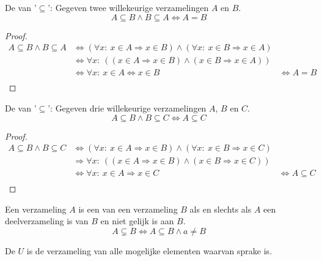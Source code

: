 \documentclass[main.tex]{subfiles}
\begin{document}
\begin{st}
  De  van '$\subseteq$': Gegeven twee willekeurige verzamelingen $A$ en $B$.
  \[ A \subseteq B \wedge B \subseteq A  \Leftrightarrow A = B \]
  \begin{proof}
    \[
    \begin{array}{cll}
      A \subseteq B \wedge B \subseteq A &\Leftrightarrow (\forall x:\ x \in A \Rightarrow x \in B) \wedge (\forall x:\ x \in B \Rightarrow x \in A) &\\
      & \Leftrightarrow \forall x:\ ((x \in A \Rightarrow x \in B) \wedge (x \in B \Rightarrow x \in A)) &\\
      & \Leftrightarrow \forall x:\ x \in A \Leftrightarrow x \in B &\Leftrightarrow A = B  \\
    \end{array}
    \]
  \end{proof}
\end{st}

\begin{st}
  De  van '$\subseteq$': Gegeven drie willekeurige verzamelingen $A$, $B$ en $C$.
  \[ A \subseteq B \wedge B \subseteq C  \Leftrightarrow A \subseteq C \]
  \begin{proof}
    \[
    \begin{array}{cll}
      A \subseteq B \wedge B \subseteq C &\Leftrightarrow (\forall x:\ x \in A \Rightarrow x \in B) \wedge (\forall x:\ x \in B \Rightarrow x \in C) &\\
      & \Rightarrow \forall x:\ ((x \in A \Rightarrow x \in B) \wedge (x \in B \Rightarrow x \in C)) &\\
      & \Leftrightarrow \forall x:\ x \in A \Rightarrow x \in C &\Leftrightarrow A \subseteq C  \\
    \end{array}
    \]
  \end{proof}
\end{st}

\begin{de}
  Een verzameling $A$ is een  van een verzameling $B$ als en slechts als $A$ een deelverzameling is van $B$ en niet gelijk is aan $B$.
  \[ A \subsetneq B \Leftrightarrow A \subseteq B \wedge a \neq B \]
\end{de}

\begin{de}
  De  $U$ is de verzameling van alle mogelijke elementen waarvan sprake is.
\end{de}
\end{document}
